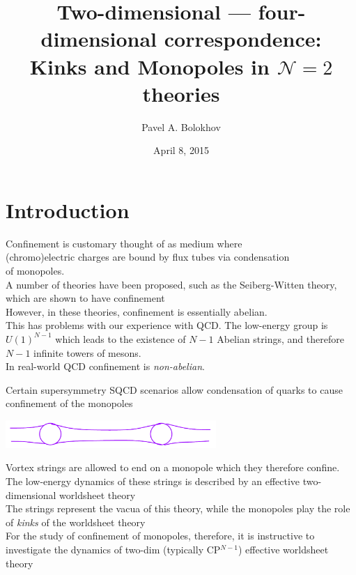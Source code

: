 \documentclass{beamer}
\title[Two-dim. --- four-dim. duality]
      {Two-dimensional --- four-dimensional correspondence:\\
	Kinks and Monopoles in $\mathcal{N}=2$ theories}
\author{Pavel A. Bolokhov}
\date{April 8, 2015}
\institute[SPbSU]{University of Minnesota Duluth}
\begin{document}
\maketitle

\section{Introduction}



\begin{frame}{}
	Confinement is customary thought of as medium where \\
	(chromo)electric charges are
	bound by flux tubes via condensation\\
	of monopoles. \\[4mm]

\pause
	A number of theories have been proposed, such as the Seiberg-Witten theory, which
	are shown to have confinement\\[4mm]

\pause
	However, in these theories, confinement is essentially abelian.\\[4mm]

\pause
	This has problems with our experience with QCD.
	The low-energy group is $ U(1)^{N-1} $ which leads to the existence of $ N-1 $ Abelian
	strings, and therefore $ N-1 $ infinite towers of mesons.\\[4mm]

\pause
	In real-world QCD confinement is \emph{non-abelian}.
\end{frame}


\begin{frame}{}
	Certain supersymmetry SQCD scenarios allow condensation of quarks to cause
	confinement of the monopoles

\begin{center}
\includegraphics[width=8.0cm]{str_mon.pdf}
\end{center}

\pause
	Vortex strings are allowed to end on a monopole which they therefore confine.
	The low-energy dynamics of these strings is described by an effective two-dimensional
	worldsheet theory\\[4mm]

\pause
	The strings represent the vacua of this theory, while the monopoles play the role
	of \emph{kinks} of the worldsheet theory\\[4mm]

\pause
	For the study of confinement of monopoles, therefore, it is instructive to investigate
	the dynamics of two-dim (typically CP$^{N-1}$) effective worldsheet theory
\end{frame}
\end{document}
